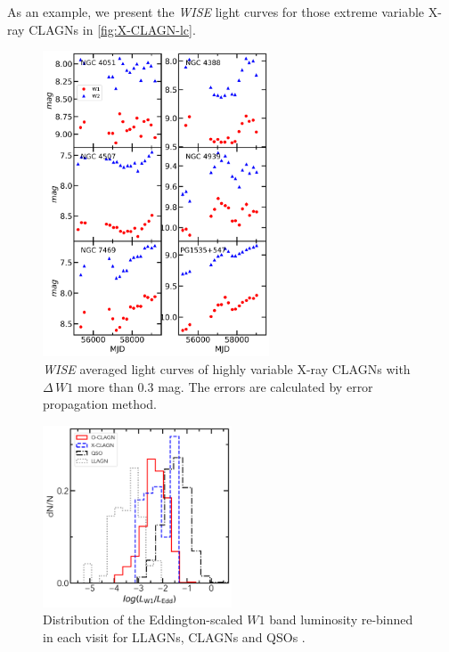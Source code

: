 As an example, we present the {\it WISE} light curves for those extreme variable X-ray CLAGNs in \autoref{fig:X-CLAGN-lc}. 
\begin{figure}
\centering
	\includegraphics[width=0.6\textwidth]{pic/wisename_varX.png}
    \caption{{\it WISE} averaged light curves of highly variable X-ray CLAGNs with $\Delta\,W1$ more than $0.3$ mag. The errors are calculated by error propagation method. }
    \label{fig:X-CLAGN-lc}
\end{figure}



\begin{figure}
\centering
	\includegraphics[width=0.5\textwidth]{pic/WISE_LW1_Ledd_hist_rebin_OX.png}
    \caption{Distribution of the Eddington-scaled $W1$ band luminosity re-binned in each visit for LLAGNs\citep{2009MNRAS.399..349G}, CLAGNs and QSOs \citep{2007ApJ...667..131G}. }
    \label{fig:distribution_ledd}
\end{figure}


